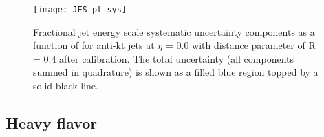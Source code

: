 \begin{figure}[htb!]
\centering
\texttt{[image: JES\_pt\_sys]}
\caption{Fractional jet energy scale systematic uncertainty components as a function of \pt for anti-kt jets at $\eta$ = 0.0 with distance parameter of R = 0.4 after calibration.
The total uncertainty (all components summed in quadrature) is shown as a filled blue region topped by a solid black line.}
\label{fig:exp.JES_pt_sys}
\end{figure} 






\subsection{Heavy flavor}

